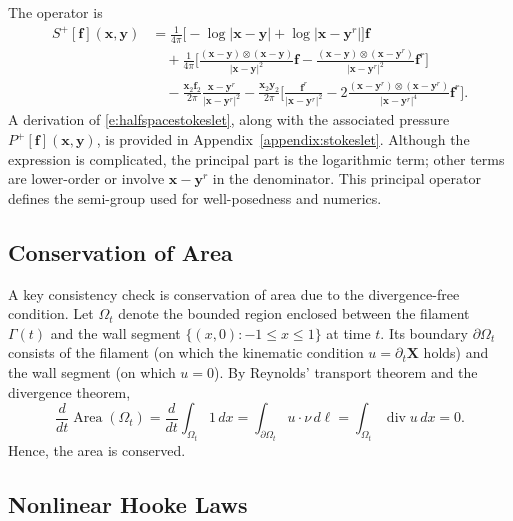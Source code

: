 \documentclass{amsart}
\newcommand{\mX}{\mathbf{X}}
\newcommand{\mx}{\mathbf{x}}
\newcommand{\my}{\mathbf{y}}
\newcommand{\mf}{\mathbf{f}}
\begin{document}
The operator is
\begin{equation}\label{e:halfspacestokeslet}
\begin{split}
S^+[\mf](\mx,\my)
&= \frac{1}{4\pi} \Big[
-\log|\mx - \my| + \log|\mx - \my^r|
\Big] \mf \\
&\quad + \frac{1}{4\pi} \Big[
\frac{(\mx - \my)\otimes (\mx - \my)}{|\mx - \my|^2} \mf
- \frac{(\mx - \my)\otimes (\mx - \my^r)}{|\mx - \my^r|^2} \mf^r
\Big] \\
&\quad - \frac{\mx_2 \mf_2}{2\pi} \frac{\mx - \my^r}{|\mx - \my^r|^2}
- \frac{\mx_2 \my_2}{2\pi} \Big[
\frac{\mf^r}{|\mx - \my^r|^2} - 2\frac{(\mx - \my^r)\otimes (\mx - \my^r)}{|\mx - \my^r|^4}\mf^r
\Big].
\end{split}
\end{equation}
A derivation of \eqref{e:halfspacestokeslet}, along with the associated pressure $P^+[\mf](\mx,\my)$, is provided in Appendix~\ref{appendix:stokeslet}.  
Although the expression is complicated, the principal part is the logarithmic term; other terms are lower-order or involve $\mx - \my^r$ in the denominator.  
This principal operator defines the semi-group used for well-posedness and numerics.

\subsection{Conservation of Area}

A key consistency check is conservation of area due to the divergence-free condition.  
Let $\Omega_t$ denote the bounded region enclosed between the filament $\Gamma(t)$ and the wall segment $\{(x,0) : -1 \le x \le 1\}$ at time $t$. Its boundary $\partial\Omega_t$ consists of the filament (on which the kinematic condition $u = \partial_t \mX$ holds) and the wall segment (on which $u = 0$).
By Reynolds' transport theorem and the divergence theorem,
\[
\frac{d}{dt}\operatorname{Area}(\Omega_t) 
= \frac{d}{dt} \int_{\Omega_t} 1\, dx 
= \int_{\partial \Omega_t} u \cdot \nu\, d\ell
= \int_{\Omega_t} \operatorname{div} u\, dx = 0.
\]
Hence, the area is conserved.

\subsection{Nonlinear Hooke Laws}
\label{ss:nonlinear_hooke}
\end{document}
